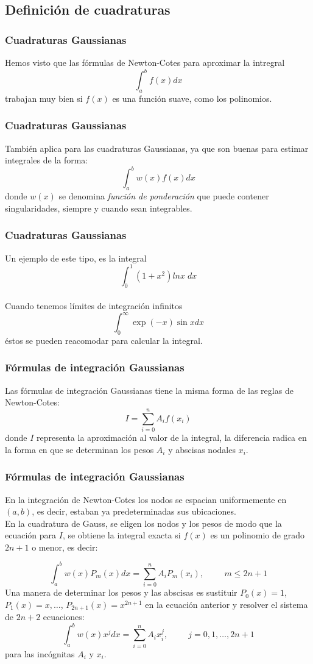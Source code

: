\subsection{Definición de cuadraturas}
\begin{frame}
\frametitle{Cuadraturas Gaussianas}
Hemos visto que las fórmulas de Newton-Cotes para aproximar la intregral
\[ \int_{a}^{b} f(x) dx\]
trabajan muy bien si $f(x)$ es una función suave, como los polinomios.
\end{frame}
\begin{frame}
\frametitle{Cuadraturas Gaussianas}
También aplica para las cuadraturas Gaussianas, ya que son buenas para estimar integrales de la forma:
\[ \int_{a}^{b} w(x) f(x) dx\]
donde $w(x)$ se denomina \emph{función de ponderación} que puede contener singularidades, siempre y cuando sean integrables.
\end{frame}
\begin{frame}
\frametitle{Cuadraturas Gaussianas}
Un ejemplo de este tipo, es la integral
\[ \int_{0}^{1} \left(1+x^{2} \right) ln x \; dx \]
\\
\bigskip
\pause
Cuando tenemos límites de integración infinitos
\[ \int_{0}^{\infty} \exp(-x) \sin x dx \]
éstos se pueden reacomodar para calcular la integral.
\end{frame}
\begin{frame}
\frametitle{Fórmulas de integración Gaussianas}
Las fórmulas de integración Gaussianas tiene la misma forma de las reglas de Newton-Cotes:
\[I = \sum_{i=0}^{n} A_{i} f(x_{i})\]
donde $I$ representa la aproximación al valor de la integral, la diferencia radica en la forma en que se determinan los pesos $A_{i}$ y abscisas nodales $x_{i}$.
\end{frame}
\begin{frame}
\frametitle{Fórmulas de integración Gaussianas}
En la integración de Newton-Cotes los nodos se espacian uniformemente en $(a, b)$, es decir, estaban ya predeterminadas sus ubicaciones.
\\
\bigskip
En la cuadratura de Gauss, se eligen los nodos y los pesos de modo que la ecuación para $I$, se obtiene la integral exacta si $f(x)$ es un polinomio de grado $2n + 1$ o menor, es decir:
\end{frame}
\begin{frame}
\[ \int_{a}^{b} w(x) P_{m}(x) dx = \sum_{i=0}^{n} A_{i}P_{m}(x_{i}), \hspace{1cm} m \leq 2n+1\]
\pause
Una manera de determinar los pesos y las abscisas es sustituir $P_{0}(x)=1$, $P_{1}(x)=x,\ldots$, $P_{2n+1}(x) = x^{2n+1}$ en la ecuación anterior y resolver el sistema de $2n+2$ ecuaciones:
\[ \int_{a}^{b} w(x) x^{j}dx = \sum_{i=0}^{n} A_{i}x_{i}^{j}, \hspace{1cm} j=0,1,\ldots,2n+1 \]
para las incógnitas $A_{i}$ y $x_{i}$.
\end{frame}

